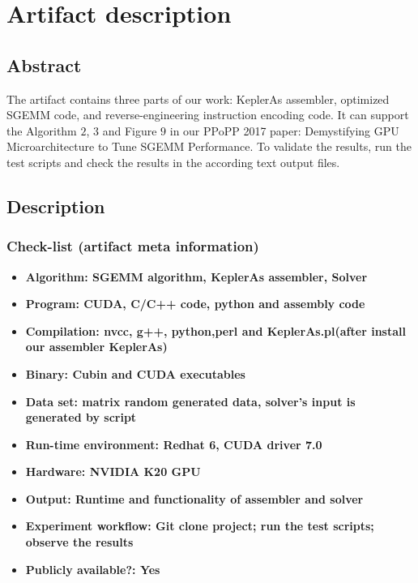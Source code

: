 \section{Artifact description}


\subsection{Abstract}

The artifact contains three parts of our work: KeplerAs assembler, optimized SGEMM code, and reverse-engineering instruction encoding code. It can support the Algorithm $2$, $3$ and Figure $9$ in our PPoPP 2017 paper: Demystifying GPU Microarchitecture to Tune SGEMM Performance. To validate the results, run the test scripts and check the results in the according text output files.

\subsection{Description}

\subsubsection{Check-list (artifact meta information)}

{\small
\begin{itemize}
  \item {\bf Algorithm: SGEMM algorithm, KeplerAs assembler, Solver}
  \item {\bf Program: CUDA, C/C++ code, python and assembly code}
  \item {\bf Compilation: nvcc, g++, python,perl and KeplerAs.pl(after install our assembler KeplerAs)}
  \item {\bf Binary: Cubin and CUDA executables}
  \item {\bf Data set: matrix random generated data, solver's input is generated by script}
  \item {\bf Run-time environment: Redhat 6, CUDA driver 7.0}
  \item {\bf Hardware: NVIDIA K20 GPU}
  \item {\bf Output: Runtime and functionality of assembler and solver}
  \item {\bf Experiment workflow: Git clone project; run the test scripts; observe the results}
  \item {\bf Publicly available?: Yes }
\end{itemize}
}

